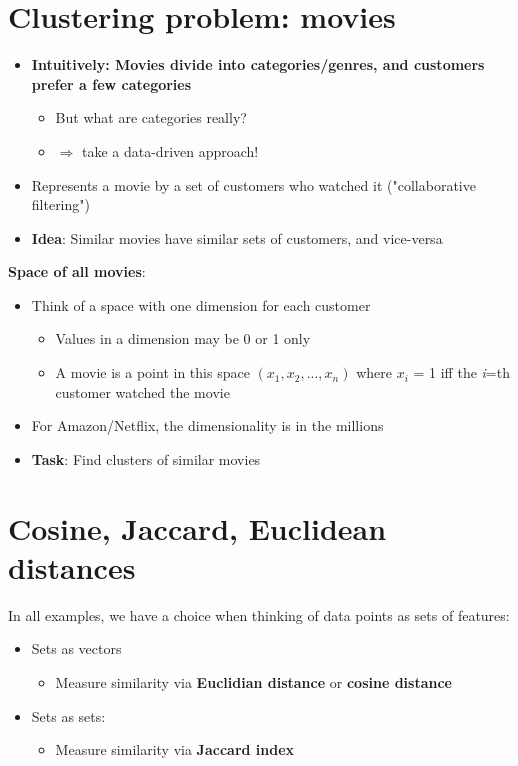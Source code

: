 \documentclass[11pt]{article}
\begin{document}
\section*{Clustering problem: movies}

\begin{itemize}
	\item \textbf{Intuitively: Movies divide into categories/genres, and customers prefer a few categories}
		\begin{itemize}
			\item But what are categories really? 
			\item $\Rightarrow$ take a data-driven approach!
		\end{itemize}
	\item Represents a movie by a set of customers who watched it ("collaborative filtering")
	\item \textbf{Idea}: Similar movies have similar sets of customers, and vice-versa
\end{itemize}

\textbf{Space of all movies}:
\begin{itemize}
	\item Think of a space with one dimension for each customer
		\begin{itemize}
			\item Values in a dimension may be 0 or 1 only
			\item A movie is a point in this space $(x_1, x_2, ..., x_n)$ where $x_i$ = 1 iff the \textit{i}=th customer watched the movie
		\end{itemize}
	\item For Amazon/Netflix, the dimensionality is in the millions
	\item \textbf{Task}: Find clusters of similar movies
\end{itemize}


\section*{Cosine, Jaccard, Euclidean distances}

In all examples, we have a choice when thinking of data points as sets of features:
\begin{itemize}
	\item Sets as vectors
		\begin{itemize}
			\item Measure similarity via \textbf{Euclidian distance} or \textbf{cosine distance}
		\end{itemize}
	\item Sets as sets:
		\begin{itemize}
			\item Measure similarity via \textbf{Jaccard index}
		\end{itemize}
\end{itemize}
\end{document}
